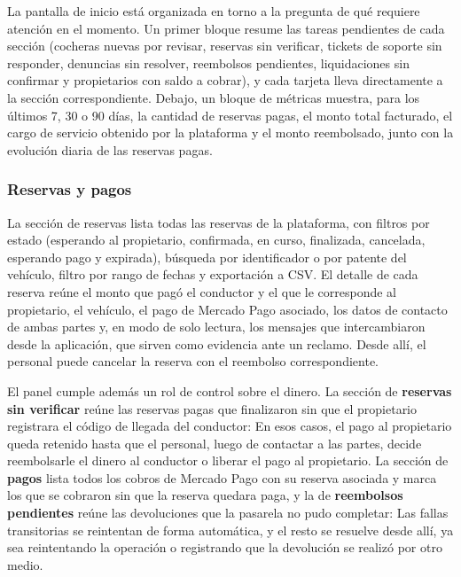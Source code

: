 La pantalla de inicio está organizada en torno a la pregunta de qué requiere atención en el momento. Un primer bloque resume las tareas pendientes de cada sección (cocheras nuevas por revisar, reservas sin verificar, tickets de soporte sin responder, denuncias sin resolver, reembolsos pendientes, liquidaciones sin confirmar y propietarios con saldo a cobrar), y cada tarjeta lleva directamente a la sección correspondiente. Debajo, un bloque de métricas muestra, para los últimos 7, 30 o 90 días, la cantidad de reservas pagas, el monto total facturado, el cargo de servicio obtenido por la plataforma y el monto reembolsado, junto con la evolución diaria de las reservas pagas.


\FloatBarrier
\subsubsection{Reservas y pagos}

La sección de reservas lista todas las reservas de la plataforma, con filtros por estado (esperando al propietario, confirmada, en curso, finalizada, cancelada, esperando pago y expirada), búsqueda por identificador o por patente del vehículo, filtro por rango de fechas y exportación a CSV. El detalle de cada reserva reúne el monto que pagó el conductor y el que le corresponde al propietario, el vehículo, el pago de Mercado Pago asociado, los datos de contacto de ambas partes y, en modo de solo lectura, los mensajes que intercambiaron desde la aplicación, que sirven como evidencia ante un reclamo. Desde allí, el personal puede cancelar la reserva con el reembolso correspondiente.


El panel cumple además un rol de control sobre el dinero. La sección de \textbf{reservas sin verificar} reúne las reservas pagas que finalizaron sin que el propietario registrara el código de llegada del conductor: En esos casos, el pago al propietario queda retenido hasta que el personal, luego de contactar a las partes, decide reembolsarle el dinero al conductor o liberar el pago al propietario. La sección de \textbf{pagos} lista todos los cobros de Mercado Pago con su reserva asociada y marca los que se cobraron sin que la reserva quedara paga, y la de \textbf{reembolsos pendientes} reúne las devoluciones que la pasarela no pudo completar: Las fallas transitorias se reintentan de forma automática, y el resto se resuelve desde allí, ya sea reintentando la operación o registrando que la devolución se realizó por otro medio.

